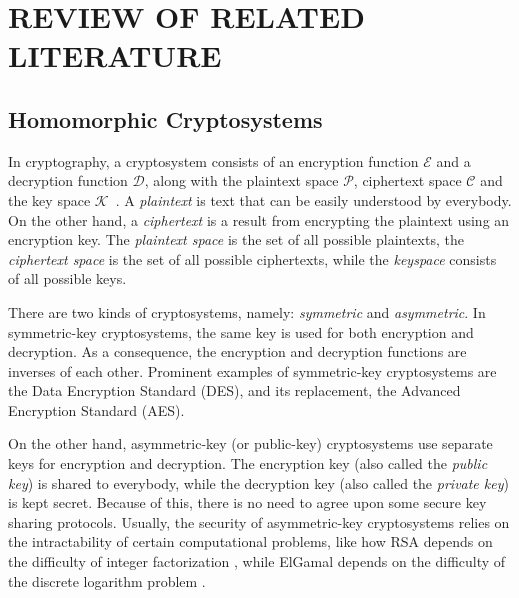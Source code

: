 \chapter{REVIEW OF RELATED LITERATURE}

\section{Homomorphic Cryptosystems}

In cryptography, a cryptosystem consists of an encryption function $\mathcal{E}$ and a decryption function $\mathcal{D}$, along with the plaintext space $\mathcal{P}$, ciphertext space $\mathcal{C}$ and the key space $\mathcal{K}$~\cite{bauer_cryptosystem_2005}. A \textit{plaintext} is text that can be easily understood by everybody. On the other hand, a \textit{ciphertext} is a result from encrypting the plaintext using an encryption key. The \textit{plaintext space} is the set of all possible plaintexts, the \textit{ciphertext space} is the set of all possible ciphertexts, while the \textit{keyspace} consists of all possible keys.

There are two kinds of cryptosystems, namely: \textit{symmetric} and \textit{asymmetric}. In symmetric-key cryptosystems, the same key is used for both encryption and decryption. As a consequence, the encryption and decryption functions are inverses of each other. Prominent examples of symmetric-key cryptosystems are the Data Encryption Standard (DES), and its replacement, the Advanced Encryption Standard (AES).

On the other hand, asymmetric-key (or public-key) cryptosystems use separate keys for encryption and decryption. The encryption key (also called the \textit{public key}) is shared to everybody, while the decryption key (also called the \textit{private key}) is kept secret. Because of this, there is no need to agree upon some secure key sharing protocols. Usually, the security of asymmetric-key cryptosystems relies on the intractability of certain computational problems, like how RSA depends on the difficulty of integer factorization \cite{rivest_method_1978}, while ElGamal depends on the difficulty of the discrete logarithm problem \cite{blakley_public_1985}.


